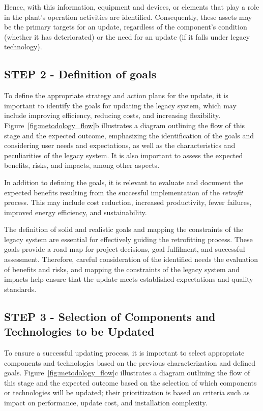 \documentclass[journal]{IEEEtran}
\begin{document}
Hence, with this information, equipment and devices, or elements that play a role in the plant's operation activities are identified. Consequently, these assets may be the primary targets for an update, regardless of the component's condition (whether it has deteriorated) or the need for an update (if it falls under legacy technology).

\subsection{STEP 2 - Definition of goals}

To define the appropriate strategy and action plans for the update, it is important to identify the goals for updating the legacy system, which may include improving efficiency, reducing costs, and increasing flexibility. Figure~\ref{fig:metodology_flow}b illustrates a diagram outlining the flow of this stage and the expected outcome, emphasizing the identification of the goals and considering user needs and expectations, as well as the characteristics and peculiarities of the legacy system. It is also important to assess the expected benefits, risks, and impacts, among other aspects.

In addition to defining the goals, it is relevant to evaluate and document the expected benefits resulting from the successful implementation of the \textit{retrofit} process. This may include cost reduction, increased productivity, fewer failures, improved energy efficiency, and sustainability.

The definition of solid and realistic goals and mapping the constraints of the legacy system are essential for effectively guiding the retrofitting process. These goals provide a road map for project decisions, goal fulfilment, and successful assessment. Therefore, careful consideration of the identified needs the evaluation of benefits and risks, and mapping the constraints of the legacy system and impacts help ensure that the update meets established expectations and quality standards.

\subsection{STEP 3 - Selection of Components and Technologies to be Updated}

To ensure a successful updating process, it is important to select appropriate components and technologies based on the previous characterization and defined goals. Figure~\ref{fig:metodology_flow}c illustrates a diagram outlining the flow of this stage and the expected outcome based on the selection of which components or technologies will be updated; their prioritization is based on criteria such as impact on performance, update cost, and installation complexity.
\end{document}
